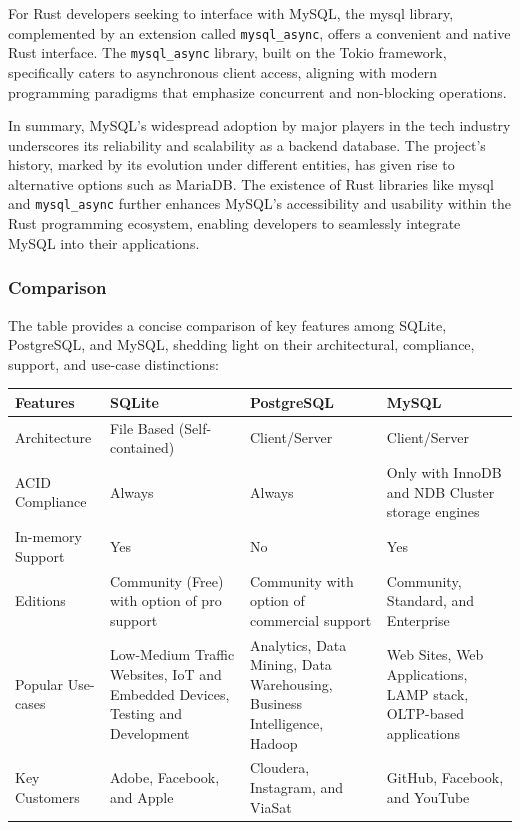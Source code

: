 For Rust developers seeking to interface with MySQL, the mysql library, complemented by an extension called \verb+mysql_async+, offers a convenient and native 
Rust interface. The \verb+mysql_async+ library, built on the Tokio framework, specifically caters to asynchronous client access, aligning with modern 
programming paradigms that emphasize concurrent and non-blocking operations.\newline

In summary, MySQL's widespread adoption by major players in the tech industry underscores its reliability and scalability as a backend database. The project's 
history, marked by its evolution under different entities, has given rise to alternative options such as MariaDB. The existence of Rust libraries like mysql 
and \verb+mysql_async+ further enhances MySQL's accessibility and usability within the Rust programming ecosystem, enabling developers to seamlessly integrate 
MySQL into their applications.

\subsubsection{Comparison}
The table provides a concise comparison of key features among SQLite, PostgreSQL, and MySQL, shedding light on their architectural, compliance, support, and 
use-case distinctions:

\begin{center}
    \begin{tabular}{ | m{3cm} | m{4cm}| m{4cm} | m{4cm} | } 
      \hline
      Features & SQLite & PostgreSQL & MySQL \\ 
      \hline
      Architecture & File Based (Self-contained) & Client/Server & Client/Server \\ 
      \hline
      ACID Compliance & Always & Always & Only with InnoDB and NDB Cluster storage engines \\ 
      \hline
      In-memory Support & Yes & No & Yes \\
      \hline
      Editions & Community (Free) with option of pro support & Community with option of commercial support & Community, Standard, and Enterprise \\
      \hline
      Popular Use-cases & Low-Medium Traffic Websites, IoT and Embedded Devices, Testing and Development & Analytics, Data Mining, Data Warehousing, Business Intelligence, Hadoop & Web Sites, Web Applications, LAMP stack, OLTP-based applications \\
      \hline
      Key Customers & Adobe, Facebook, and Apple & Cloudera, Instagram, and ViaSat & GitHub, Facebook, and YouTube \\
      \hline
    \end{tabular}
\end{center}

